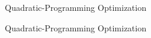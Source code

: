 \begin{frame}[fragile]{Quadratic-Programming Optimization}
\end{frame}

\begin{frame}[fragile]{Quadratic-Programming Optimization}
\end{frame}